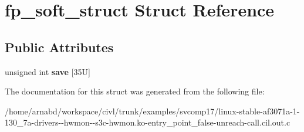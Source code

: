 \hypertarget{structfp__soft__struct}{}\section{fp\+\_\+soft\+\_\+struct Struct Reference}
\label{structfp__soft__struct}
\subsection*{Public Attributes}
\begin{DoxyCompactItemize}
\item 
\hypertarget{structfp__soft__struct_a710943e23fa79c1e22fe7e0fde575118}{}unsigned int {\bfseries save} \mbox{[}35\+U\mbox{]}\label{structfp__soft__struct_a710943e23fa79c1e22fe7e0fde575118}

\end{DoxyCompactItemize}


The documentation for this struct was generated from the following file\+:\begin{DoxyCompactItemize}
\item 
/home/arnabd/workspace/civl/trunk/examples/svcomp17/linux-\/stable-\/af3071a-\/1-\/130\+\_\+7a-\/drivers-\/-\/hwmon-\/-\/s3c-\/hwmon.\+ko-\/entry\+\_\+point\+\_\+false-\/unreach-\/call.\+cil.\+out.\+c\end{DoxyCompactItemize}
